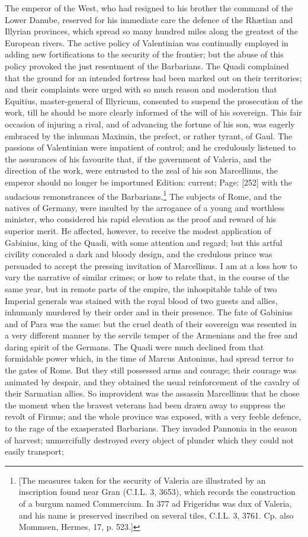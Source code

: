 The emperor of the West, who had resigned to his brother the command of the Lower Danube, reserved for his immediate care the defence of the Rhætian and Illyrian provinces, which spread so many hundred miles along the greatest of the European rivers. The active policy of Valentinian was continually employed in adding new fortifications to the security of the frontier; but the abuse of this policy provoked the just resentment of the Barbarians. The Quadi complained that the ground for an intended fortress had been marked out on their territories; and their complaints were urged with so much reason and moderation that Equitius, master-general of Illyricum, consented to suspend the prosecution of the work, till he should be more clearly informed of the will of his sovereign. This fair occasion of injuring a rival, and of advancing the fortune of his son, was eagerly embraced by the inhuman Maximin, the prefect, or rather tyrant, of Gaul. The passions of Valentinian were impatient of control; and he credulously listened to the assurances of his favourite that, if the government of Valeria, and the direction of the work, were entrusted to the zeal of his son Marcellinus, the emperor should no longer be importuned Edition: current; Page: [252] with the audacious remonstrances of the Barbarians.\footnote{[The measures taken for the security of Valeria are illustrated by an inscription found near Gran (C.I.L. 3, 3653), which records the construction of a burgum named Commercium. In 377 ad Frigeridus was dux of Valeria, and his name is preserved inscribed on several tiles, C.I.L. 3, 3761. Cp. also Mommsen, Hermes, 17, p. 523.]} The subjects of Rome, and the natives of Germany, were insulted by the arrogance of a young and worthless minister, who considered his rapid elevation as the proof and reward of his superior merit. He affected, however, to receive the modest application of Gabinius, king of the Quadi, with some attention and regard; but this artful civility concealed a dark and bloody design, and the credulous prince was persuaded to accept the pressing invitation of Marcellinus. I am at a loss how to vary the narrative of similar crimes; or how to relate that, in the course of the same year, but in remote parts of the empire, the inhospitable table of two Imperial generals was stained with the royal blood of two guests and allies, inhumanly murdered by their order and in their presence. The fate of Gabinius and of Para was the same: but the cruel death of their sovereign was resented in a very different manner by the servile temper of the Armenians and the free and daring spirit of the Germans. The Quadi were much declined from that formidable power which, in the time of Marcus Antoninus, had spread terror to the gates of Rome. But they still possessed arms and courage; their courage was animated by despair, and they obtained the usual reinforcement of the cavalry of their Sarmatian allies. So improvident was the assassin Marcellinus that he chose the moment when the bravest veterans had been drawn away to suppress the revolt of Firmus; and the whole province was exposed, with a very feeble defence, to the rage of the exasperated Barbarians. They invaded Pannonia in the season of harvest; unmercifully destroyed every object of plunder which they could not easily transport; 